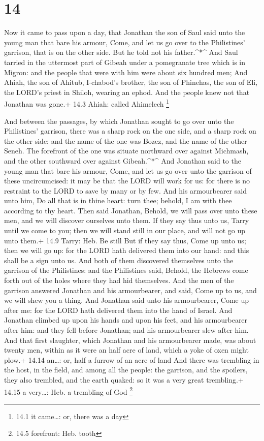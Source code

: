 \hypertarget{section-13}{%
\section{14}\label{section-13}}

 Now it came to pass upon a day, that Jonathan the son of
Saul said unto the young man that bare his armour, Come, and let us go
over to the Philistines' garrison, that is on the other side. But he
told not his father.\^{}*\^{}  And Saul tarried in the
uttermost part of Gibeah under a pomegranate tree which is in Migron:
and the people that were with him were about six hundred men;
 And Ahiah, the son of Ahitub, I-chabod's brother, the son
of Phinehas, the son of Eli, the LORD's priest in Shiloh, wearing an
ephod. And the people knew not that Jonathan was gone.+ 14.3 Ahiah:
called Ahimelech \footnote{14.1 it came\ldots: or, there was a day}

 And between the passages, by which Jonathan sought to go
over unto the Philistines' garrison, there was a sharp rock on the one
side, and a sharp rock on the other side: and the name of the one was
Bozez, and the name of the other Seneh.  The forefront of
the one was situate northward over against Michmash, and the other
southward over against Gibeah.\^{}*\^{}  And Jonathan said
to the young man that bare his armour, Come, and let us go over unto the
garrison of these uncircumcised: it may be that the LORD will work for
us: for there is no restraint to the LORD to save by many or by few.
 And his armourbearer said unto him, Do all that is in thine
heart: turn thee; behold, I am with thee according to thy heart.
 Then said Jonathan, Behold, we will pass over unto these
men, and we will discover ourselves unto them.  If they say
thus unto us, Tarry until we come to you; then we will stand still in
our place, and will not go up unto them.+ 14.9 Tarry: Heb. Be still
 But if they say thus, Come up unto us; then we will go up:
for the LORD hath delivered them into our hand: and this shall be a sign
unto us.  And both of them discovered themselves unto the
garrison of the Philistines: and the Philistines said, Behold, the
Hebrews come forth out of the holes where they had hid themselves.
 And the men of the garrison answered Jonathan and his
armourbearer, and said, Come up to us, and we will shew you a thing. And
Jonathan said unto his armourbearer, Come up after me: for the LORD hath
delivered them into the hand of Israel.  And Jonathan
climbed up upon his hands and upon his feet, and his armourbearer after
him: and they fell before Jonathan; and his armourbearer slew after him.
 And that first slaughter, which Jonathan and his
armourbearer made, was about twenty men, within as it were an half acre
of land, which a yoke of oxen might plow.+ 14.14 an\ldots: or, half a
furrow of an acre of land  And there was trembling in the
host, in the field, and among all the people: the garrison, and the
spoilers, they also trembled, and the earth quaked: so it was a very
great trembling.+ 14.15 a very\ldots: Heb. a trembling of God
\footnote{14.5 forefront: Heb. tooth}

